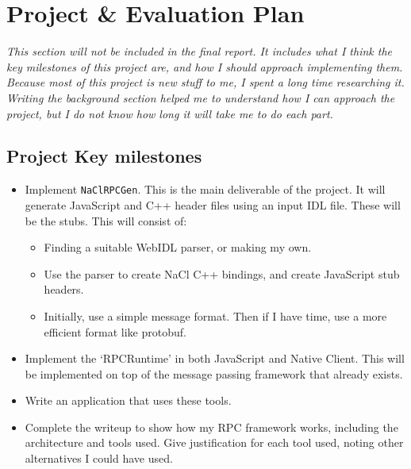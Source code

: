 \chapter{Project \& Evaluation Plan} 

\label{Chapter3} 
\emph{
	This section will not be included in the final report. It includes what I think the key milestones of this project are, and how I should approach implementing them. Because most of this project is new stuff to me, I spent a long time researching it. Writing the background section helped me to understand how I can approach the project, but I do not know how long it will take me to do each part.
}



\section{Project Key milestones}
\begin{itemize}
	\item Implement \verb+NaClRPCGen+. This is the main deliverable of the project. It will generate JavaScript and C++ header files using an input IDL file. These will be the stubs. This will consist of:
	\begin{itemize}
		\item Finding a suitable WebIDL parser, or making my own.
		\item Use the parser to create NaCl C++ bindings, and create JavaScript stub headers.
		\item Initially, use a simple message format. Then if I have time, use a more efficient format like protobuf.
	\end{itemize}
	\item Implement the `RPCRuntime' in both JavaScript and Native Client. This will be implemented on top of the message passing framework that already exists.
	\item Write an application that uses these tools.
	\item Complete the writeup to show how my RPC framework works, including the architecture and tools used. Give justification for each tool used, noting other alternatives I could have used.
\end{itemize}

